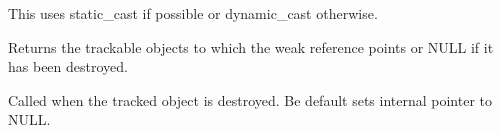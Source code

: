 This uses static\_cast if possible or dynamic\_cast otherwise.

\label{wxweakrefgettrackable}


Returns the trackable objects to which the weak reference
points or NULL if it has been destroyed.

\label{wxweakrefonobjectdestroy}


Called when the tracked object is destroyed. Be default sets
internal pointer to NULL.

